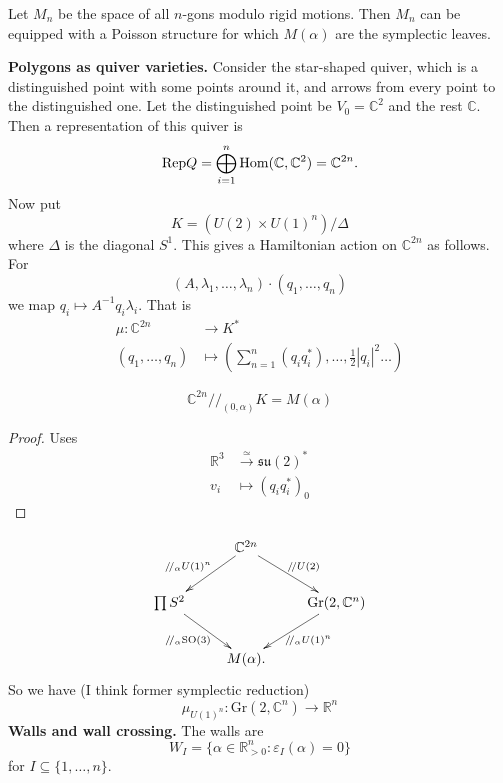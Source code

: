 \begin{remark}
\label{remark-Hausmann-Knutson}
Let $M_n$ be the space of all $n$-gons
modulo rigid motions. Then $M_n$ 
can be equipped with a Poisson structure
for which $M(\alpha)$ are the symplectic
leaves. 

\medskip\noindent
{\bf Polygons as quiver varieties.}
Consider the star-shaped quiver,
which is a distinguished point with some points around it,
and arrows from every point to the distinguished one.
Let the distinguished point be $V_0=\mathbb{C}^2$ and
the rest $\mathbb{C}$. Then a representation of this quiver
is
$$
\text{Rep}Q=\bigoplus_{i=1}^n \mathop{\mathrm{Hom}}\nolimits(\mathbb{C},\mathbb{C}^2)=\mathbb{C}^{2n}.
$$
Now put
$$
K=(U(2) \times U(1)^n)/\Delta
$$
where $\Delta$ is the diagonal $S^1$.
This gives a Hamiltonian action on $\mathbb{C}^{2n}$
as follows. For
$$
(A,\lambda_1,\ldots,\lambda_n)\cdot (q_1,\ldots,q_n)
$$
we map
$q_i \mapsto  A^{-1}q_i \lambda_i$.
That is
\begin{align*}
\mu: \mathbb{C}^{2n} &\longrightarrow K^* \\
(q_1,\ldots,q_n) &\longmapsto 
\left(\sum_{n=1}^n (q_iq_i^* ),\ldots,\frac{1}{2}|q_i|^2\ldots\right)
\end{align*}

\begin{theorem}
\label{theorem-Hausmann-Knutson}
$$
\mathbb{C}^{2n}/\!/_{(0,\alpha)}K=M(\alpha)
$$
\end{theorem}

\begin{proof}
Uses 
\begin{align*}
\mathbb{R}^3  &\xrightarrow{\simeq} \mathfrak{su}(2)^* \\
v_i &\longmapsto (q_iq_i^*)_0
\end{align*}
\end{proof}
\end{remark}

$$
\xymatrix{
&\mathbb{C}^{2n}\ar[dl]_{/\!/_\alpha U(1)^n}
\ar[dr]^{/\!/U(2)}\\
\prod S^2 \ar[dr]_{/\!/_\alpha \text{SO}(3)}
 &  &  \text{Gr}(2,\mathbb{C}^n)\ar[dl]^{/\!/_\alpha U(1)^n}\\
&M(\alpha).
}
$$
So we have (I think former symplectic reduction)
$$
\mu_{U(1)^n}:\text{Gr}(2,\mathbb{C}^n)\to \mathbb{R}^n
$$
\medskip\noindent
{\bf Walls and wall crossing.}
The walls are
$$
W_I=\{\alpha \in \mathbb{R}^n_{>0}:\varepsilon_I(\alpha)=0\}
$$
for $I \subseteq \{1,\ldots,n\}$.

